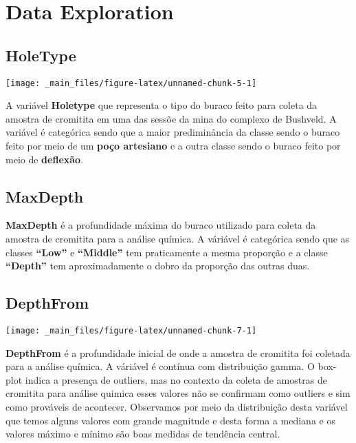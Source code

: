 \documentclass[
]{article}
\begin{document}
\newpage

\hypertarget{data-exploration}{%
\section{Data Exploration}\label{data-exploration}}

\hypertarget{holetype}{%
\subsection{HoleType}\label{holetype}}

\begin{center}\texttt{[image: \_main\_files/figure-latex/unnamed-chunk-5-1]} \end{center}

A variável \textbf{Holetype} que representa o tipo do buraco feito para coleta da amostra de cromitita em uma das sessõe da mina do complexo de Bushveld. A variável é categórica sendo que a maior prediminância da classe sendo o buraco feito por meio de um \textbf{poço artesiano} e a outra classe sendo o buraco feito por meio de \textbf{deflexão}.

\hypertarget{maxdepth}{%
\subsection{MaxDepth}\label{maxdepth}}

\textbf{MaxDepth} é a profundidade máxima do buraco utilizado para coleta da amostra de cromitita para a análise química. A váriável é categórica sendo que as classes \textbf{``Low''} e \textbf{``Middle''} tem praticamente a mesma proporção e a classe \textbf{``Depth''} tem aproximadamente o dobro da proporção das outras duas.

\hypertarget{depthfrom}{%
\subsection{DepthFrom}\label{depthfrom}}

\begin{center}\texttt{[image: \_main\_files/figure-latex/unnamed-chunk-7-1]} \end{center}

\textbf{DepthFrom} é a profundidade inicial de onde a amostra de cromitita foi coletada para a análise química. A váriável é contínua com distribuição gamma. O box-plot indica a presença de outliers, mas no contexto da coleta de amostras de cromitita para análise quimica esses valores não se confirmam como outliers e sim como prováveis de acontecer. Observamos por meio da distribuição desta variável que temos alguns valores com grande magnitude e desta forma a mediana e os valores máximo e mínimo são boas medidas de tendência central.
\end{document}
